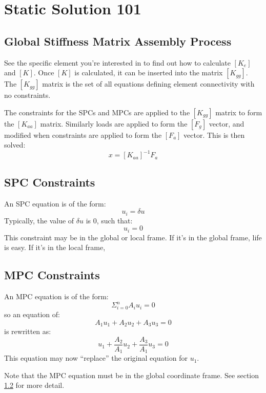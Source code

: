 \section{Static Solution 101}
\label{sol101}
   \subsection{Global Stiffness Matrix Assembly Process}
     See the specific element you're interested in to find out how to calculate $[K_e]$ and $[K]$.
     Once $[K]$ is calculated, it can be inserted into the matrix $[K_{gg}]$.  The $[K_{gg}]$ matrix
     is the set of all equations defining element connectivity with no constraints.
     
     The constraints for the SPCs and MPCs are applied to the $[K_{gg}]$ matrix to form the  $[K_{aa}]$
     matrix.  Similarly loads are applied to form the $[F_g]$ vector, and modified when
     constraints are applied to form the $[F_a]$ vector. This is then solved:
     \[ {x} = [K_{aa}]^{-1} {F_a}  \]

   \subsection{SPC Constraints}
   \label{SPC Constraints}
     An SPC equation is of the form:
      \[ u_i =\delta u \]
     Typically, the value of $\delta u$ is 0, such that:
      \[ u_i = 0 \]
     This constraint may be in the global or local frame.  If it's in the global frame, life is easy.
     If it's in the local frame, 

   \subsection{MPC Constraints}
   \label{MPC Constraints}
     An MPC equation is of the form:
      \[ \Sigma_{i=0}^n A_i u_i =0 \]
     so an equation of:
      \[ A_1u_1 + A_2u_2 + A_3u_3 = 0 \]
     is rewritten as:
      \[ u_1 + \frac{A_2}{A_1}u_2 + \frac{A_3}{A_1}u_3 =0 \]
     This equation may now ``replace'' the original equation for $u_1$.
     
     Note that the MPC equation must be in the global coordinate frame.  See section \ref{SPC Constraints} for more detail.
     